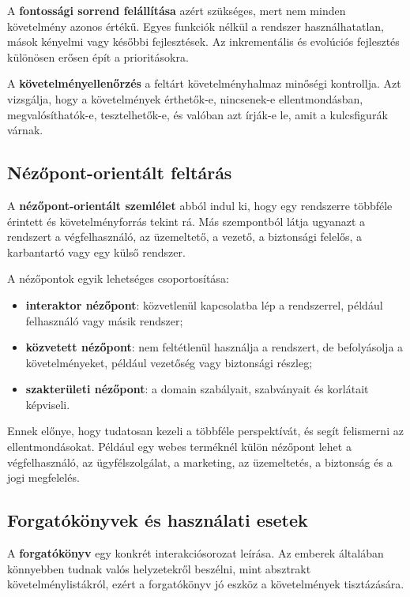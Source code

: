 A \textbf{fontossági sorrend felállítása} azért szükséges, mert nem minden követelmény azonos értékű. Egyes funkciók nélkül a rendszer használhatatlan, mások kényelmi vagy későbbi fejlesztések. Az inkrementális és evolúciós fejlesztés különösen erősen épít a prioritásokra.

A \textbf{követelményellenőrzés} a feltárt követelményhalmaz minőségi kontrollja. Azt vizsgálja, hogy a követelmények érthetők-e, nincsenek-e ellentmondásban, megvalósíthatók-e, tesztelhetők-e, és valóban azt írják-e le, amit a kulcsfigurák várnak.

\subsection{Nézőpont-orientált feltárás}

A \textbf{nézőpont-orientált szemlélet} abból indul ki, hogy egy rendszerre többféle érintett és követelményforrás tekint rá. Más szempontból látja ugyanazt a rendszert a végfelhasználó, az üzemeltető, a vezető, a biztonsági felelős, a karbantartó vagy egy külső rendszer.

A nézőpontok egyik lehetséges csoportosítása:

\begin{itemize}
  \item \textbf{interaktor nézőpont}: közvetlenül kapcsolatba lép a rendszerrel, például felhasználó vagy másik rendszer;
  \item \textbf{közvetett nézőpont}: nem feltétlenül használja a rendszert, de befolyásolja a követelményeket, például vezetőség vagy biztonsági részleg;
  \item \textbf{szakterületi nézőpont}: a domain szabályait, szabványait és korlátait képviseli.
\end{itemize}

Ennek előnye, hogy tudatosan kezeli a többféle perspektívát, és segít felismerni az ellentmondásokat. Például egy webes terméknél külön nézőpont lehet a végfelhasználó, az ügyfélszolgálat, a marketing, az üzemeltetés, a biztonság és a jogi megfelelés.

\subsection{Forgatókönyvek és használati esetek}

A \textbf{forgatókönyv} egy konkrét interakciósorozat leírása. Az emberek általában könnyebben tudnak valós helyzetekről beszélni, mint absztrakt követelménylistákról, ezért a forgatókönyv jó eszköz a követelmények tisztázására.

